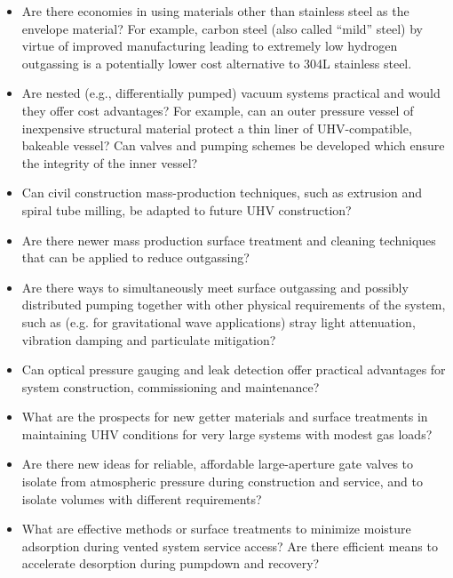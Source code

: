 \begin{itemize}
\item  Are there economies in using materials other than stainless steel as the envelope material? %
For example, carbon steel (also called ``mild'' steel) by virtue of improved manufacturing leading to extremely low hydrogen outgassing is a potentially lower cost alternative to 304L stainless steel. 

\item Are nested (e.g., differentially pumped) vacuum systems practical and would they offer cost advantages? For example, can an outer pressure vessel of inexpensive structural material protect a thin liner of UHV-compatible, bakeable vessel?  Can valves and pumping schemes be developed which ensure the integrity of the inner vessel?

\item Can civil construction mass-production techniques, such as extrusion and spiral tube milling, be adapted to future UHV construction?

\item Are there newer mass production surface treatment and cleaning techniques that can be applied to reduce outgassing? %

\item Are there ways to simultaneously meet surface outgassing and possibly distributed pumping together with other physical requirements of the system, such as (e.g. for gravitational wave applications) stray light attenuation, vibration damping and particulate mitigation?

\item Can optical pressure gauging and leak detection offer practical advantages for system construction, commissioning and maintenance?

\item What are the prospects for new getter materials and surface treatments in maintaining UHV conditions for very large systems with modest gas loads?

\item Are there new ideas for reliable, affordable large-aperture gate valves to isolate from atmospheric pressure during construction and service, and to isolate volumes with different requirements?

\item What are effective methods or surface treatments to minimize moisture adsorption during vented system service access? Are there efficient means to accelerate desorption during pumpdown and recovery?

\end{itemize}

